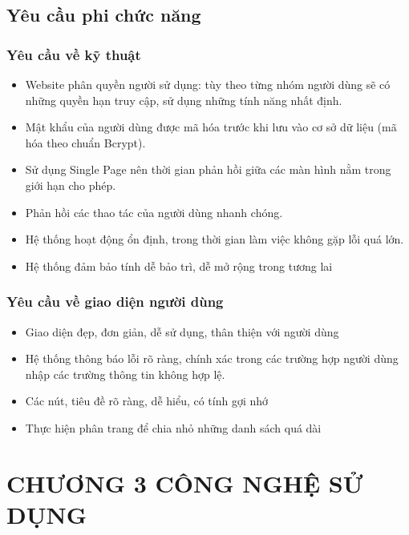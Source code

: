\documentclass{article}
\begin{document}
\subsection{Yêu cầu phi chức năng}
\subsubsection{Yêu cầu về kỹ thuật}
\begin{itemize}
    \item Website phân quyền người sử dụng: tùy theo từng nhóm người dùng sẽ có những quyền hạn truy cập, sử dụng những tính năng nhất định. 
    \item Mật khẩu của người dùng được mã hóa trước khi lưu vào cơ sở dữ liệu (mã hóa theo chuẩn Bcrypt).
    \item Sử dụng Single Page nên thời gian phản hồi giữa các màn hình nằm trong giới hạn cho phép.
    \item Phản hồi các thao tác của người dùng nhanh chóng.
    \item Hệ thống hoạt động ổn định, trong thời gian làm việc không gặp lỗi quá lớn.
    \item Hệ thống đảm bảo tính dễ bảo trì, dễ mở rộng trong tương lai
\end{itemize}
\subsubsection{Yêu cầu về giao diện người dùng}
\begin{itemize}
    \item Giao diện đẹp, đơn giản, dễ sử dụng, thân thiện với người dùng
    \item Hệ thống thông báo lỗi rõ ràng, chính xác trong các trường hợp người dùng nhập các trường thông tin không hợp lệ.
    \item Các nút, tiêu đề rõ ràng, dễ hiểu, có tính gợi nhớ
    \item Thực hiện phân trang để chia nhỏ những danh sách quá dài
\end{itemize}
\newpage

\section*{CHƯƠNG 3 CÔNG NGHỆ SỬ DỤNG}
\setcounter{section}{3}
\setcounter{subsection}{0}
\end{document}
